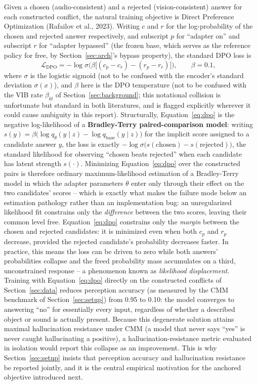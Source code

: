 \documentclass[11pt,a4paper,oneside]{article}
\begin{document}
Given a chosen (audio-consistent) and a rejected (vision-consistent) answer for each constructed
conflict, the natural training objective is Direct Preference Optimization (Rafailov et al., 2023).
Writing $c$ and $r$ for the log-probability of the chosen and rejected answer respectively, and
subscript $p$ for ``adapter on'' and subscript $r$ for ``adapter bypassed'' (the frozen base, which
serves as the reference policy for free, by Section~\ref{sec:arch}'s bypass property), the standard
DPO loss is
\begin{equation}
\mathcal L_{\text{DPO}} = -\log\sigma\Big(\beta\big[(c_p-c_r) - (r_p-r_r)\big]\Big), \qquad \beta=0.1,
\label{eq:dpo}
\end{equation}
where $\sigma$ is the logistic sigmoid (not to be confused with the encoder's standard deviation
$\sigma(x)$), and $\beta$ here is the DPO temperature (not to be confused with the VIB rate
$\beta_{kl}$ of Section~\ref{sec:background}; this notational collision is unfortunate but standard
in both literatures, and is flagged explicitly wherever it could cause ambiguity in this report).
Structurally, Equation~\eqref{eq:dpo} is the negative log-likelihood of a \textbf{Bradley-Terry
paired-comparison model}: writing $s(y)=\beta\big(\log q_\theta(y\mid z)-\log q_{\text{base}}(y\mid
z)\big)$ for the implicit score assigned to a candidate answer $y$, the loss is exactly
$-\log\sigma\big(s(\text{chosen})-s(\text{rejected})\big)$, the standard likelihood for observing
``chosen beats rejected'' when each candidate has latent strength $s(\cdot)$. Minimizing
Equation~\eqref{eq:dpo} over the constructed pairs is therefore ordinary maximum-likelihood
estimation of a Bradley-Terry model in which the adapter parameters $\theta$ enter only through
their effect on the two candidates' scores -- which is exactly what makes the failure mode below an
estimation pathology rather than an implementation bug: an unregularized likelihood fit constrains
only the \emph{difference} between the two scores, leaving their common level free.
Equation~\eqref{eq:dpo} constrains only the \emph{margin} between the chosen and rejected candidates:
it is minimized even when both $c_p$ and $r_p$ decrease, provided the rejected candidate's
probability decreases faster. In practice, this means the loss can be driven to zero while both
answers' probabilities collapse and the freed probability mass accumulates on a third,
unconstrained response -- a phenomenon known as \emph{likelihood displacement}. Training with
Equation~\eqref{eq:dpo} directly on the constructed conflicts of Section~\ref{sec:data} reduces
perception accuracy (as measured by the CMM benchmark of Section~\ref{sec:setup}) from 0.95 to 0.10:
the model converges to answering ``no'' for essentially every input, regardless of whether a
described object or sound is actually present. Because this degenerate solution attains maximal
hallucination resistance under CMM (a model that never says ``yes'' is never caught hallucinating a
positive), a hallucination-resistance metric evaluated in isolation would report this collapse as an
improvement. This is why Section~\ref{sec:setup} insists that perception accuracy and hallucination
resistance be reported jointly, and it is the central empirical motivation for the anchored objective
introduced next.
\end{document}
